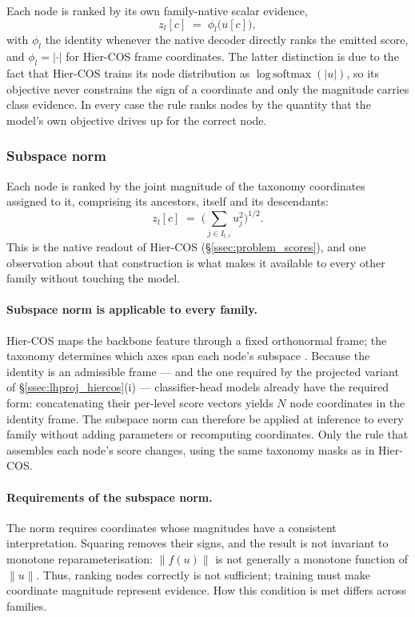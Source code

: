 Each node is ranked by its own family-native scalar evidence,
\[
z_l[c] \;=\; \phi_l\big(u[c]\big),
\]
with $\phi_l$ the identity whenever the native decoder directly ranks the
emitted score, and $\phi_l=\lvert\cdot\rvert$ for Hier-COS frame coordinates.
The latter distinction is due to the fact that Hier-COS trains its node distribution as
$\operatorname{log\,softmax}(\lvert u\rvert)$, so its objective never constrains
the sign of a coordinate and only the magnitude carries class evidence. In every
case the rule ranks nodes by the quantity that the model's own objective drives
up for the correct node.

\subsubsection{Subspace norm}

Each node is ranked by the joint magnitude of the taxonomy
coordinates assigned to it, comprising its ancestors, itself and its
descendants:
\[
z_l[c] \;=\; \Big(\sum_{j\in I_{l,c}}u_j^2\Big)^{1/2} .
\]
This is the native readout of Hier-COS (\S\ref{ssec:problem_scores}), and one
observation about that construction is what makes it available to every other
family without touching the model.

\paragraph{Subspace norm is applicable to every family.} Hier-COS maps the
backbone feature through a fixed orthonormal frame; the taxonomy determines which
axes span each node's subspace \cite{sani2025hiercos}. Because the identity is an
admissible frame --- and the one required by the projected variant of
\S\ref{ssec:lhproj_hiercos}(i) --- classifier-head models already have the required
form: concatenating their per-level score vectors yields $N$ node coordinates in
the identity frame. The subspace norm can therefore be applied at inference to
every family without adding parameters or recomputing coordinates. Only the rule
that assembles each node's score changes, using the same taxonomy masks as in
Hier-COS.

\paragraph{Requirements of the subspace norm.} The norm requires coordinates
whose magnitudes have a consistent interpretation. Squaring removes their signs,
and the result is not invariant to monotone reparameterisation:
$\lVert f(u)\rVert$ is not generally a monotone function of $\lVert u\rVert$.
Thus, ranking nodes correctly is not sufficient; training must make coordinate
magnitude represent evidence. How this condition is met differs across families.

